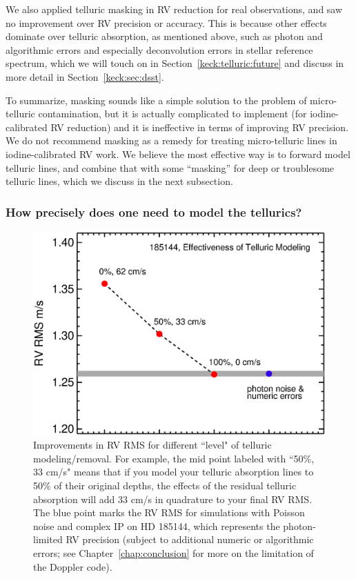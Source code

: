 We also applied telluric masking in RV reduction for real
observations, and saw no improvement over RV precision or
accuracy. This is because other effects dominate over telluric
absorption, as mentioned above, such as photon and algorithmic errors
and especially deconvolution errors in stellar reference spectrum,
which we will touch on in Section~\ref{keck:telluric:future} and
discuss in more detail in Section~\ref{keck:sec:dsst}.

To summarize, masking sounds like a simple solution to the problem of
micro-telluric contamination, but it is actually complicated to
implement (for iodine-calibrated RV reduction) and it is ineffective
in terms of improving RV precision. We do not recommend masking as a
remedy for treating micro-telluric lines in iodine-calibrated RV
work. We believe the most effective way is to forward model telluric
lines, and combine that with some ``masking'' for deep or troublesome
telluric lines, which we discuss in the next subsection.

\subsubsection{How precisely does one need to model the tellurics?}


\begin{figure}
\includegraphics[scale=0.5]{telluric/neid.eps} 
\caption{Improvements in RV RMS for different ``level" of telluric
  modeling/removal. For example, the mid point labeled with ``50\%, 33 cm/s"
  means that if you model your telluric absorption lines to 50\% of
  their original depths, the effects of the residual telluric
  absorption will add 33 cm/s in quadrature to your final RV RMS. The
  blue point marks the RV RMS for simulations with Poisson noise and
  complex IP on HD 185144, which represents the photon-limited RV
  precision (subject to additional numeric or algorithmic errors; see
  Chapter~\ref{chap:conclusion} for more on the limitation of the
  Doppler code).
\label{telluric:fig:neid}}
\end{figure}


